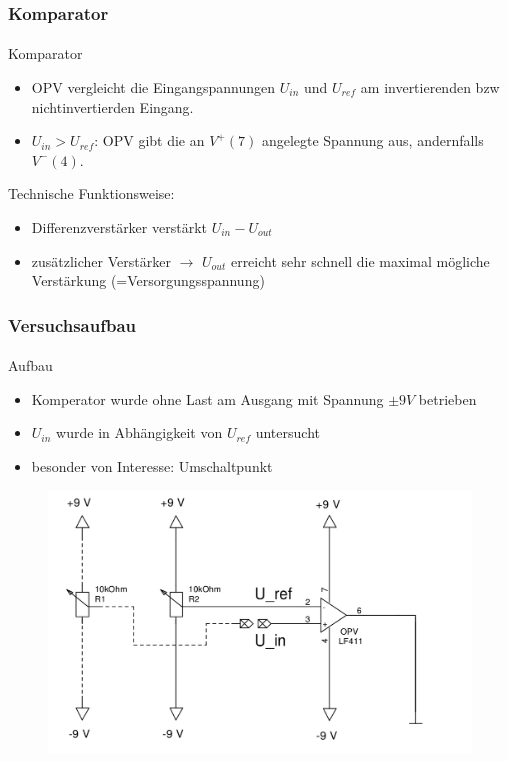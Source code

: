 \begin{frame}
\frametitle{Komparator}
\framesubtitle{}
    \begin{block}{Komparator}
        \begin{itemize}
            \item OPV vergleicht die Eingangspannungen $U_{in}$ und $U_{ref}$
            am invertierenden bzw nichtinvertierden Eingang.   
            \item $U_{in} > U_{ref}$: OPV gibt die an $V^+ (7)$ angelegte
            Spannung aus, andernfalls $V^- (4)$.
        \end{itemize}
    \end{block}
    \begin{block}{Technische Funktionsweise:}
        \begin{itemize}
            \item Differenzverstärker verstärkt $U_{in} - U_{out}$
            \item zusätzlicher Verstärker $\rightarrow$ $U_{out}$ erreicht sehr schnell die maximal mögliche
            Verstärkung (=Versorgungsspannung)
        \end{itemize}
    \end{block}
\end{frame}

\begin{frame}
\frametitle{Versuchsaufbau}
\framesubtitle{}
    \begin{block}{Aufbau}
         \begin{itemize}
             \item Komperator wurde ohne Last am Ausgang mit Spannung $\pm 9V$
             betrieben
             \item $U_{in}$ wurde in Abhängigkeit von $U_{ref}$ untersucht
             \item besonder von Interesse: Umschaltpunkt
         \end{itemize}
    \end{block}
    \begin{figure}[H]
    \begin{center}
            \includegraphics[scale=0.2]{./img/schaltung/komparator_1.png}
    \end{center}
    \end{figure}
\end{frame}

